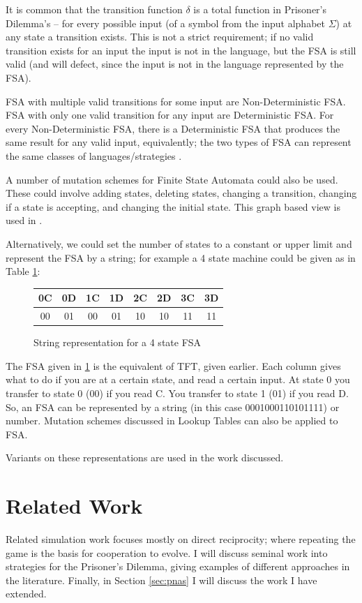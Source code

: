\documentclass[a4paper,11pt,bcshonoursthesis,singlespace,oneside,thesisdraft,pdflatex]{cssethesis}
\renewcommand{\cite}{\citep} %
\begin{document}
It is common that the transition function $\delta$ is a total function in Prisoner's Dilemma's -- for every possible input (of a symbol from the input alphabet $\Sigma$) at any state a transition exists. 
This is not a strict requirement; if no valid transition exists for an input the input is not in the language, but the FSA is still valid (and will defect, since the input is not in the language represented by the FSA). 

FSA with multiple valid transitions for some input are Non-Deterministic FSA. 
FSA with only one valid transition for any input are Deterministic FSA. 
For every Non-Deterministic FSA, there is a Deterministic FSA that produces the same result for any valid input, equivalently; the two types of FSA can represent the same classes of languages/strategies \citep[][pp 35 -- 63]{Sipser2006}. 

A number of mutation schemes for Finite State Automata could also be used. 
These could involve adding states, deleting states, changing a transition, changing if a state is accepting, and changing the initial state. 
This graph based view is used in \cite{van-veelen:PNAS:2012}. 

Alternatively, we could set the number of states to a constant or upper limit and represent the FSA by a string; for example a 4 state machine could be given as in Table \ref{table:fsa4state}:
\begin{figure}[h]
\center
\begin{tabular}{|c|c|c|c|c|c|c|c|}
\hline
0C & 0D & 1C&1D&2C&2D&3C&3D\\
\hline
00 & 01 & 00&01&10&10&11&11\\
\hline
\end{tabular}\hfill
\caption{String representation for a 4 state FSA}
\label{table:fsa4state}
\end{figure}

The FSA given in \ref{table:fsa4state} is the equivalent of TFT, given earlier. 
Each column gives what to do if you are at a certain state, and read a certain input. 
At state 0 you transfer to state 0 (00) if you read C. 
You transfer to state 1 (01) if you read D. 
So, an FSA can be represented by a string (in this case 0001000110101111) or number. 
Mutation schemes discussed in Lookup Tables can also be applied to FSA. 

Variants on these representations are used in the work discussed.
\section{Related Work}
\label{sec:relatedWork}
Related simulation work focuses mostly on direct reciprocity; where repeating the game is the basis for cooperation to evolve. 
I will discuss seminal work into strategies for the Prisoner's Dilemma, giving examples of different approaches in the literature. Finally, in Section \ref{sec:pnas} I will discuss the work I have extended.
\end{document}
